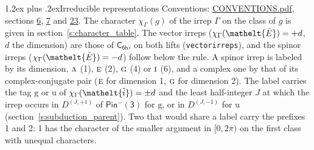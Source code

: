 \documentclass[10pt,a4paper]{article}
\makeatletter
\renewcommand\section{\@startsection{section}{1}{\z@}{-3ex plus -1ex minus -.2ex}%
  {1.2ex plus .2ex}{\normalfont\large\sffamily\bfseries\color{parttitle}}}
\numberwithin{equation}{section}
\newcommand{\eltfont}[1]{{\let\sigma\eltsigma\mathelt{#1}}}
\newcommand{\grp}[1]{\mathsf{#1}}
\newcommand{\irr}[1]{\text{\normalfont\scshape #1}}
\newcommand{\elt}[1]{\eltfont{#1}}
\newcommand{\ptag}[1]{\mathrm{#1}}
\newcommand{\irrJp}[2]{D^{(#1,#2)}}
\newcommand{\irchar}[1]{\chi_{#1}}
\newcommand{\barred}[1]{\bar{#1}}
\newcommand{\lift}[1]{\tilde{#1}}
\makeatother
\begin{document}
\section{Irreducible representations}\label{s:irreps}
Conventions: \href{../../CONVENTIONS.pdf}{CONVENTIONS.pdf}, sections \href{../../../rotation/CONVENTIONS.pdf\#conv.6}{6}, \href{../../../rotation/CONVENTIONS.pdf\#conv.7}{7} and \href{../../CONVENTIONS.pdf\#conv.23}{23}.
\leavevmode\label{n:function.character}\label{n:irrep.Gamma}The character $\irchar{\Gamma}(g)$ of the irrep $\Gamma$ on the class of $g$ is given in section~\ref{s:character_table}. \label{n:index.dimension}The vector irreps ($\irchar{\Gamma}(\elt{\barred{E}}) = +d$, $d$ the dimension) are those of \href{../../../rotation/data/pdf/C6h.pdf}{$\grp{C_{6h}}$}, on both lifts (\texttt{vectorirreps}), and the spinor irreps ($\irchar{\Gamma}(\elt{\barred{E}}) = -d$) follow below the rule. A spinor irrep is labeled by its dimension, $\irr{a}$ (1), $\irr{e}$ (2), $\irr{g}$ (4) or $\irr{i}$ (6), and a complex one by that of its complex-conjugate pair ($\irr{e}$ for dimension 1, $\irr{g}$ for dimension 2). The label carries the tag $\ptag{g}$ or $\ptag{u}$ of $\irchar{\Gamma}(\elt{\lift{i}}) = \pm d$ and the least half-integer $J$ at which the irrep occurs in $\irrJp{J}{+1}$ of $\grp{Pin^{-}(3)}$ for $\ptag{g}$, or in $\irrJp{J}{-1}$ for $\ptag{u}$ (section~\ref{s:subduction_parent}). Two that would share a label carry the prefixes 1 and 2: 1 has the character of the smaller argument in $[0, 2\pi)$ on the first class with unequal characters.
\end{document}
